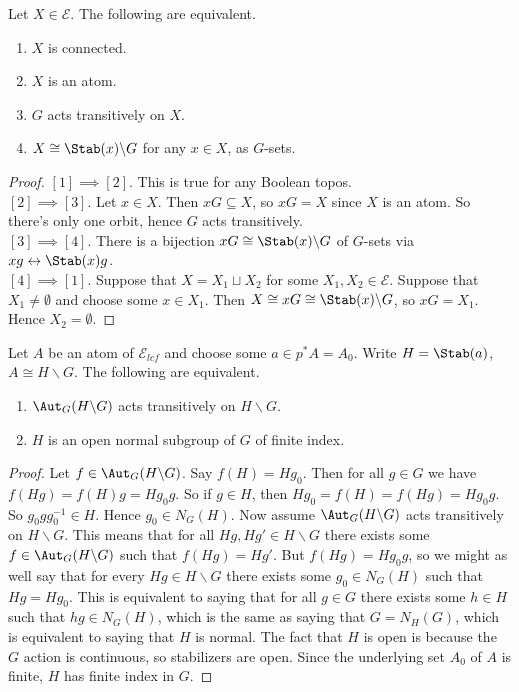 \begin{lemma}
Let $X \in \mathscr{E}$. The following are equivalent.
\begin{enumerate}
	\item $X$ is connected.
	\item $X$ is an atom.
	\item $G$ acts transitively on $X$.
	\item $X \cong \Stab(x) \backslash G$ for any $x \in X$, as $G$-sets.
\end{enumerate}
\end{lemma}
\begin{proof}
$[1] \implies [2]$. This is true for any Boolean topos. \\
$[2] \implies [3]$. Let $x \in X$. Then $xG \subseteq X$, so $xG = X$ since $X$ is an atom. So there's only one orbit, hence $G$ acts transitively. \\
$[3] \implies [4]$. There is a bijection $xG \cong \Stab(x) \backslash G$ of $G$-sets via $xg \leftrightarrow \Stab(x)g$. \\
$[4] \implies [1]$. Suppose that $X = X_1 \sqcup X_2$ for some $X_1, X_2 \in \mathscr{E}$. Suppose that $X_1 \neq \emptyset$ and choose some $x \in X_1$. Then $X \cong xG \cong \Stab(x) \backslash G$, so $xG = X_1$. Hence $X_2 = \emptyset$.
\end{proof}

\begin{lemma}
Let $A$ be an atom of $\mathscr{E}_{lcf}$ and choose some $a \in p^*A = A_0$. Write $H = \Stab(a)$, $A \cong H\backslash G$. The following are equivalent.
\begin{enumerate}
	\item $\Aut_G(H \backslash G)$ acts transitively on $H \backslash G$.
	\item $H$ is an open normal subgroup of $G$ of finite index.
\end{enumerate}
\end{lemma}
\begin{proof}
Let $f \in \Aut_G(H \backslash G)$. Say $f(H) = Hg_0$. Then for all $g \in G$ we have $f(Hg) = f(H)g = Hg_0g$. So if $g \in H$, then $Hg_0 = f(H) = f(Hg) = Hg_0 g$. So $g_0gg_0^{-1} \in H$. Hence $g_0 \in N_G(H)$. Now assume $\Aut_G(H \backslash G)$ acts transitively on $H \backslash G$. This means that for all $Hg, Hg' \in H \backslash G$ there exists some $f \in \Aut_G(H \backslash G)$ such that $f(Hg) = Hg'$. But $f(Hg) = Hg_0 g$, so we might as well say that for every $Hg \in H \backslash G$ there exists some $g_0 \in N_G(H)$ such that $Hg = Hg_0$. This is equivalent to saying that for all $g \in G$ there exists some $h \in H$ such that $hg \in N_G(H)$, which is the same as saying that $G = N_H(G)$, which is equivalent to saying that $H$ is normal. The fact that $H$ is open is because the $G$ action is continuous, so stabilizers are open. Since the underlying set $A_0$ of $A$ is finite, $H$ has finite index in $G$.
\end{proof}

